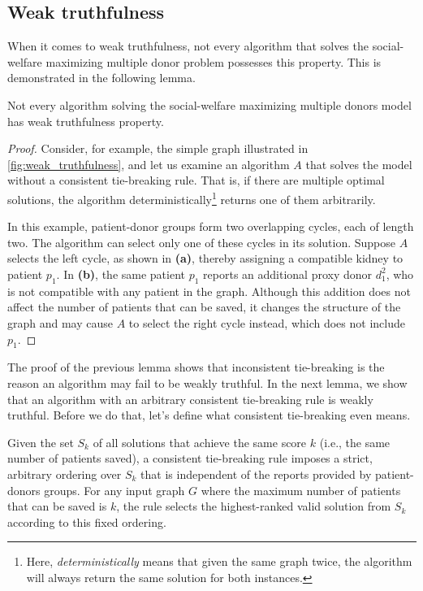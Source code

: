 \subsection{Weak truthfulness}
When it comes to weak truthfulness, not every algorithm that solves the social-welfare maximizing multiple donor problem possesses this property. This is demonstrated in the following lemma.

\begin{lemma}
\label{lemma:weak_truthfulness_false}
    Not every algorithm solving the social-welfare maximizing multiple donors model has weak truthfulness property.
    \begin{proof}
        Consider, for example, the simple graph illustrated in \autoref{fig:weak_truthfulness}, and let us examine an algorithm $A$ that solves the model without a consistent tie-breaking rule. That is, if there are multiple optimal solutions, the algorithm deterministically\footnote{Here, \textit{deterministically} means that given the same graph twice, the algorithm will always return the same solution for both instances.} returns one of them arbitrarily.
    
        In this example, patient-donor groups form two overlapping cycles, each of length two. The algorithm can select only one of these cycles in its solution. Suppose $A$ selects the left cycle, as shown in \textbf{(a)}, thereby assigning a compatible kidney to patient $p_1$. In \textbf{(b)}, the same patient $p_1$ reports an additional proxy donor $d_1^2$, who is not compatible with any patient in the graph. Although this addition does not affect the number of patients that can be saved, it changes the structure of the graph and may cause $A$ to select the right cycle instead, which does not include $p_1$.
    \end{proof}
\end{lemma}

The proof of the previous lemma shows that inconsistent tie-breaking is the reason an algorithm may fail to be weakly truthful. In the next lemma, we show that an algorithm with an arbitrary consistent tie-breaking rule is weakly truthful. Before  we do that, let's define what consistent tie-breaking even means.

\begin{definition}
    Given the set $S_k$ of all solutions that achieve the same score $k$ (i.e., the same number of patients saved), a consistent tie-breaking rule imposes a strict, arbitrary ordering over $S_k$ that is independent of the reports provided by patient-donors groups. For any input graph $G$ where the maximum number of patients that can be saved is $k$, the rule selects the highest-ranked valid solution from $S_k$ according to this fixed ordering.
\end{definition}


